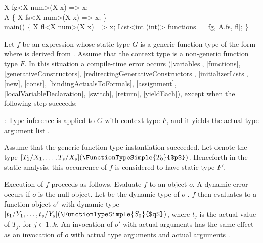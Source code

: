 \documentclass[makeidx]{article}
\begin{document}
{\begin{dartCode}
X fg<X \EXTENDS{} num>(X x) => x;
\\
\CLASS{} A \{
  \STATIC{} X fs<X \EXTENDS{} num>(X x) => x;
\}
\\
\VOID{} main() \{
  X fl<X \EXTENDS{} num>(X x) => x;
  List<int \FUNCTION{}(int)> functions = [fg, A.fs, fl];
\}
\end{dartCode}

\noindent
{}

\LMHash{}%
Let $f$ be an expression whose static type $G$ is
%
a generic function type of the form
where  is derived from .
Assume that the context type is a non-generic function type $F$.
In this situation a compile-time error occurs
(\ref{variables},
\ref{functions},
\ref{generativeConstructors},
\ref{redirectingGenerativeConstructors},
\ref{initializerLists},
\ref{new},
\ref{const},
\ref{bindingActualsToFormals},
\ref{assignment},
\ref{localVariableDeclaration},
\ref{switch},
\ref{return},
\ref{yieldEach}),
except when the following step succeeds:

\LMHash{}%
:
Type inference is applied to $G$ with context type $F$,
and it yields the actual type argument list
%
.


\LMHash{}%
Assume that the generic function type instantiation succeeded.
Let  denote the type
$[T_1/X_1, \ldots, T_s/X_s](\FunctionTypeSimple{T_0}{$p$})$.
Henceforth in the static analysis,
this occurrence of $f$ is considered to have static type $F'$.

\LMHash{}%
Execution of $f$ proceeds as follows.
Evaluate $f$ to an object $o$.
A dynamic error occurs if $o$ is the null object.
Let  be the dynamic type of $o$
.
$f$ then evaluates to a function object $o'$ with dynamic type
$[t_1/Y_1, \ldots, t_s/Y_s](\FunctionTypeSimple{S_0}{$q$})$,
where $t_j$ is the actual value of $T_j$, for $j \in 1 .. k$.
An invocation of $o'$ with actual arguments  has
the same effect as an invocation of $o$
with actual type arguments  and actual arguments .

}
\end{document}
